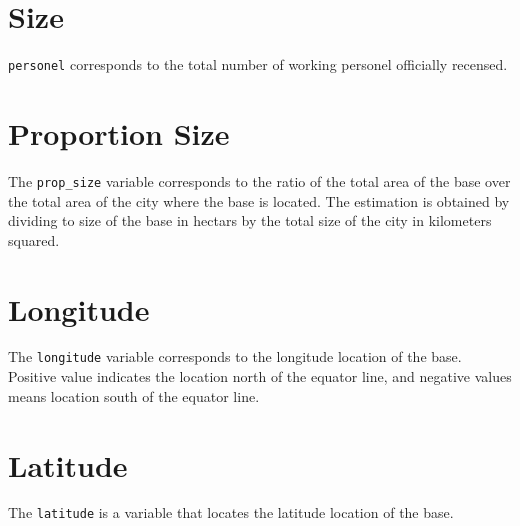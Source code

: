 \documentclass{article}\usepackage[]{graphicx}\usepackage[dvipsnames]{xcolor}
\begin{document}
\section{Size}

\verb|personel| corresponds to the total number of working personel 
officially recensed. 

\section{Proportion Size}

The \verb|prop_size| variable corresponds to the ratio of the 
total area of the base over the total area of the city where the 
base is located. The estimation is obtained by dividing to size of 
the base in hectars by the total size of the city in kilometers
squared. 

\section{Longitude}

The \verb|longitude| variable corresponds to the longitude location
of the base. Positive value indicates the location north of the
equator line, and negative values means location south of the equator
line.

\section{Latitude}

The \verb|latitude| is a variable that locates the latitude 
location of the base. 
\end{document}
